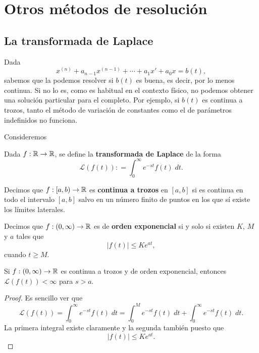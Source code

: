 \chapter{Otros métodos de resolución}
\section{La transformada de Laplace}
Dada
\[x^{\left(n\right)} + a_{n-1}x^{\left(n-1\right)} + \cdots + a_{1}x' + a_{0}x = b\left(t\right), \]
sabemos que la podemos resolver si $\displaystyle b\left(t\right) $ es buena, es decir, por lo menos continua. Si no lo es, como es habitual en el contexto físico, no podemos obtener una solución particular para el completo. Por ejemplo, si $\displaystyle b\left(t\right) $ es continua a trozos, tanto el método de variación de constantes como el de parámetros indefinidos no funciona. 
\begin{eg}
Consideremos 
\end{eg}
\begin{definition}
Dada $\displaystyle f : \mathbb{R} \to \mathbb{R} $, se define la \textbf{transformada de Laplace} de la forma
\[\mathcal{L}\left(f\left(t\right)\right) : = \int^{\infty}_{0} e^{-st}f\left(t\right) \; dt .\]
\end{definition}
\begin{definition}
	Decimos que $\displaystyle f : [a,b) \to \mathbb{R} $ es \textbf{continua a trozos} en $\displaystyle \left[a,b\right]  $ si es continua en todo el intervalo $\displaystyle \left[a,b\right]  $ salvo en un número finito de puntos en los que sí existe los límites laterales.
\end{definition}
\begin{definition}
Decimos que $\displaystyle f : \left(0,\infty\right)\to \mathbb{R} $ es de \textbf{orden exponencial} si y solo si existen $\displaystyle K $, $\displaystyle M $ y $\displaystyle a $ tales que 
\[ \left|f\left(t\right)\right|\leq Ke^{at} ,\]
cuando $\displaystyle t \geq M $. 
\end{definition}
\begin{prop}
Si $\displaystyle f : \left(0,\infty\right)\to \mathbb{R} $ es continua a trozos y de orden exponencial, entonces $\displaystyle \mathcal{L}\left(f\left(t\right)\right)<\infty $ para $\displaystyle s > a $. 
\end{prop}
\begin{proof}
Es sencillo ver que 
\[\mathcal{L}\left(f\left(t\right)\right)=\int^{\infty}_{0} e^{-st}f\left(t\right) \; dt = \int^{M}_{0} e^{-st}f\left(t\right) \; dt + \int^{\infty}_{0} e^{-st}f\left(t\right) \; dt .\]
La primera integral existe claramente y la segunda también puesto que
\[ \left|f\left(t\right)\right|\leq Ke^{at}.\]
\end{proof}
